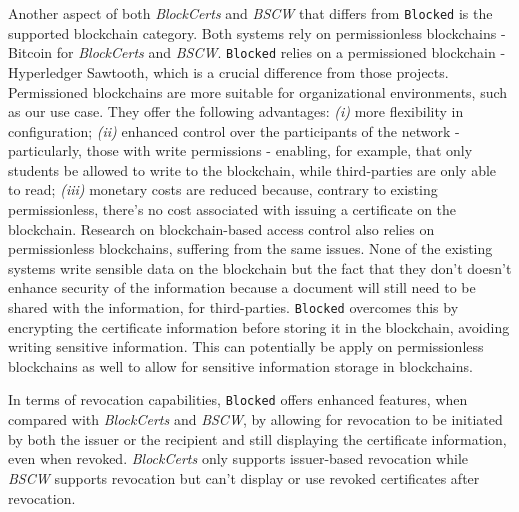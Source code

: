 Another aspect of both \emph{BlockCerts} and \emph{BSCW} that differs from \texttt{Blocked} is the supported blockchain category. Both systems rely on permissionless blockchains - Bitcoin for \emph{BlockCerts} and \emph{BSCW}. \texttt{Blocked} relies on a permissioned blockchain - Hyperledger Sawtooth, which is a crucial difference from those projects. Permissioned blockchains are more suitable for organizational environments, such as our use case. They offer the following advantages: \emph{(i)} more flexibility in configuration; \emph{(ii)} enhanced control over the participants of the network - particularly, those with write permissions - enabling, for example, that only students be allowed to write to the blockchain, while third-parties are only able to read; \emph{(iii)} monetary costs are reduced because, contrary to existing permissionless, there's no cost associated with issuing a certificate on the blockchain. Research on blockchain-based access control \cite{maesa_blockchain_2017} also relies on permissionless blockchains, suffering from the same issues. None of the existing systems write sensible data on the blockchain but the fact that they don't doesn't enhance security of the information because a document will still need to be shared with the information, for third-parties. \texttt{Blocked} overcomes this by encrypting the certificate information before storing it in the blockchain, avoiding writing sensitive information. This can potentially be apply on permissionless blockchains as well to allow for sensitive information storage in blockchains.

In terms of revocation capabilities, \texttt{Blocked} offers enhanced features, when compared with \emph{BlockCerts} and \emph{BSCW}, by allowing for revocation to be initiated by both the issuer or the recipient and still displaying the certificate information, even when revoked. \emph{BlockCerts} only supports issuer-based revocation while \emph{BSCW} supports revocation but can't display or use revoked certificates after revocation.

